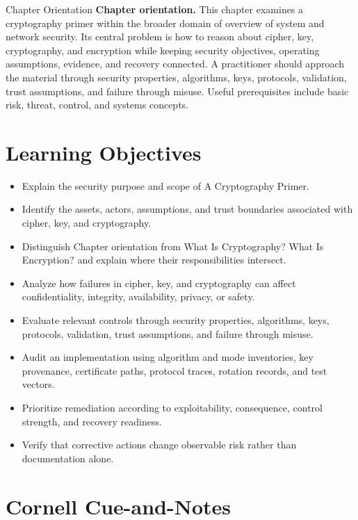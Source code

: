 \documentclass[11pt,letterpaper]{article}
\title{\CornellDocumentTitle}
\author{}
\date{}
\begin{document}
\maketitle
\begin{CornellOverviewBox}{Chapter Orientation}
\textbf{Chapter orientation.} This chapter examines a cryptography primer within the broader domain of overview of system and network security. Its central problem is how to reason about cipher, key, cryptography, and encryption while keeping security objectives, operating assumptions, evidence, and recovery connected. A practitioner should approach the material through security properties, algorithms, keys, protocols, validation, trust assumptions, and failure through misuse. Useful prerequisites include basic risk, threat, control, and systems concepts.
\end{CornellOverviewBox}
\section*{Learning Objectives}
\begin{itemize}
\item Explain the security purpose and scope of A Cryptography Primer.
\item Identify the assets, actors, assumptions, and trust boundaries associated with cipher, key, and cryptography.
\item Distinguish Chapter orientation from What Is Cryptography? What Is Encryption? and explain where their responsibilities intersect.
\item Analyze how failures in cipher, key, and cryptography can affect confidentiality, integrity, availability, privacy, or safety.
\item Evaluate relevant controls through security properties, algorithms, keys, protocols, validation, trust assumptions, and failure through misuse.
\item Audit an implementation using algorithm and mode inventories, key provenance, certificate paths, protocol traces, rotation records, and test vectors.
\item Prioritize remediation according to exploitability, consequence, control strength, and recovery readiness.
\item Verify that corrective actions change observable risk rather than documentation alone.
\end{itemize}
\section*{Cornell Cue-and-Notes}
\end{document}
